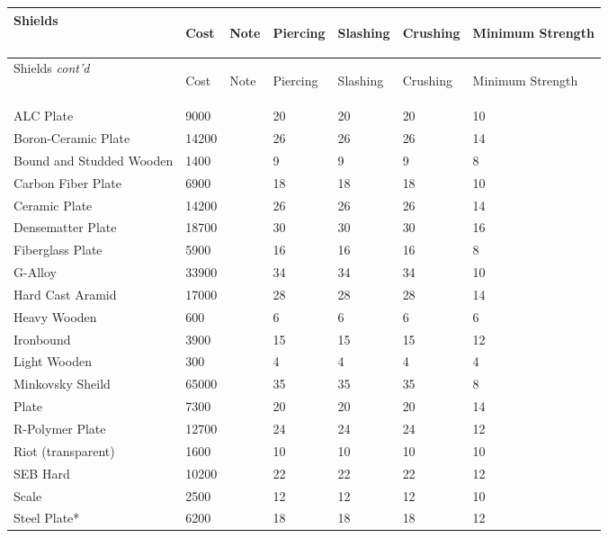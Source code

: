 \documentclass[twoside]{book}
\begin{document}
\begin{longtable}{p{1.25in}llp{3em}p{3em}p{3em}p{3em}} 
  Shields& \begin{turn}{70}{Cost}\end{turn}
          & \begin{turn}{70}{Note}\end{turn}
          & \begin{turn}{70}{Piercing}\end{turn}
          & \begin{turn}{70}{Slashing}\end{turn}
          & \begin{turn}{70}{Crushing}\end{turn}
          & \begin{turn}{70}{Minimum Strength}\end{turn}
          \\
  \hline
  \hline
  \endfirsthead
  Shields \textit{cont'd}
        & \begin{turn}{70}{Cost}\end{turn}
          & \begin{turn}{70}{Note}\end{turn}
          & \begin{turn}{70}{Piercing}\end{turn}
          & \begin{turn}{70}{Slashing}\end{turn}
          & \begin{turn}{70}{Crushing}\end{turn}
          & \begin{turn}{70}{Minimum Strength}\end{turn}
           \\
  \hline
  \endhead
\raggedright  ALC Plate& 9000&& 20& 20& 20& 10\tabularnewline
      \raggedright  Boron-Ceramic Plate& 14200&& 26& 26& 26& 14\tabularnewline
      \raggedright  Bound and Studded Wooden& 1400&& 9& 9& 9& 8\tabularnewline
      \raggedright  Carbon Fiber Plate& 6900&& 18& 18& 18& 10\tabularnewline
      \raggedright  Ceramic Plate& 14200&& 26& 26& 26& 14\tabularnewline
      \raggedright  Densematter Plate& 18700&& 30& 30& 30& 16\tabularnewline
      \raggedright  Fiberglass Plate& 5900&& 16& 16& 16& 8\tabularnewline
      \raggedright  G-Alloy& 33900&& 34& 34& 34& 10\tabularnewline
      \raggedright  Hard Cast Aramid& 17000&& 28& 28& 28& 14\tabularnewline
      \raggedright  Heavy Wooden& 600&& 6& 6& 6& 6\tabularnewline
      \raggedright  Ironbound& 3900&& 15& 15& 15& 12\tabularnewline
      \raggedright  Light Wooden& 300&& 4& 4& 4& 4\tabularnewline
      \raggedright  Minkovsky Sheild& 65000&& 35& 35& 35& 8\tabularnewline
      \raggedright  Plate& 7300&& 20& 20& 20& 14\tabularnewline
      \raggedright  R-Polymer Plate& 12700&& 24& 24& 24& 12\tabularnewline
      \raggedright  Riot (transparent)& 1600&& 10& 10& 10& 10\tabularnewline
      \raggedright  SEB Hard& 10200&& 22& 22& 22& 12\tabularnewline
      \raggedright  Scale& 2500&& 12& 12& 12& 10\tabularnewline
      \raggedright  Steel Plate*& 6200&& 18& 18& 18& 12\tabularnewline
      
\end{longtable}
    
\end{document}
